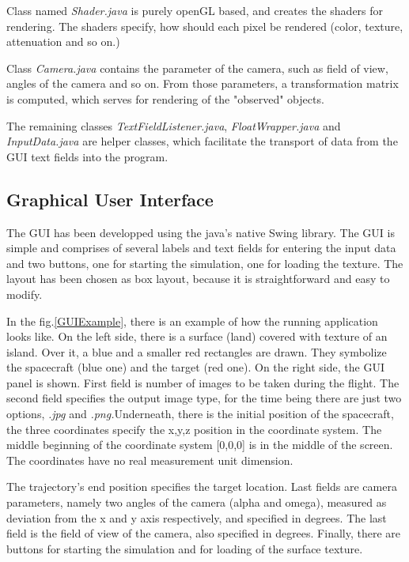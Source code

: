 \documentclass[english,12pt,a4paper,pdftex,elec,utf8]{aaltothesis}
\begin{document}
Class named \textit{Shader.java} is purely openGL based, and creates the shaders for rendering. The shaders specify, how should each pixel be rendered (color, texture, attenuation and so on.)

Class \textit{Camera.java} contains the parameter of the camera, such as field of view, angles of the camera and so on. From those parameters, a transformation matrix is computed, which serves for rendering of the "observed" objects.

The remaining classes \textit{TextFieldListener.java}, \textit{FloatWrapper.java} and \textit{InputData.java} are helper classes, which facilitate the transport of data from the GUI text fields into the program.

\subsection*{Graphical User Interface}

The GUI has been developped using the java's native Swing library. The GUI is simple and comprises of several labels and text fields for entering the input data and two buttons, one for starting the simulation, one for loading the texture. The layout has been chosen as box layout, because it is straightforward and easy to modify.

In the fig.\ref{GUIExample}, there is an example of how the running application looks like. On the left side, there is a surface (land) covered with texture of an island. Over it, a blue and a smaller red rectangles are drawn. They symbolize the spacecraft (blue one) and the target (red one). On the right side, the GUI panel is shown. First field is number of images to be taken during the flight. The second field specifies the output image type, for the time being there are just two options, \textit{.jpg} and \textit{.png.}Underneath, there is the initial position of the spacecraft, the three coordinates specify the x,y,z position in the coordinate system. The middle beginning of the coordinate system [0,0,0] is in the middle of the screen. The coordinates have no real measurement unit dimension.

The trajectory's end position specifies the target location. Last fields are camera parameters, namely two angles of the camera (alpha and omega), measured as deviation from the x and y axis respectively, and specified in degrees. The last field is the field of view of the camera, also specified in degrees. Finally, there are buttons for starting the simulation and for loading of the surface texture.
\end{document}
